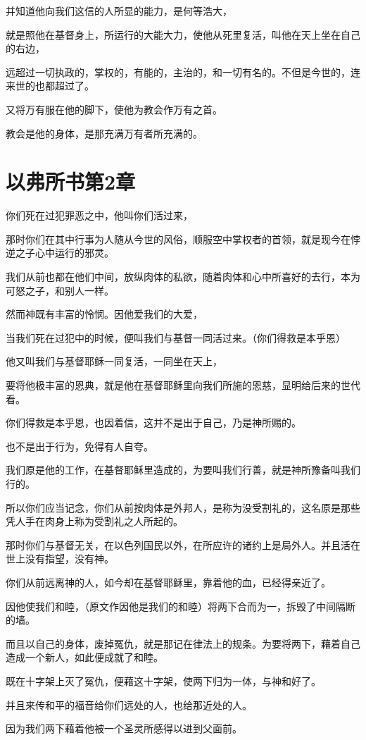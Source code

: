 \documentclass[12pt,oneside]{book}
\begin{document}
并知道他向我们这信的人所显的能力，是何等浩大，

就是照他在基督身上，所运行的大能大力，使他从死里复活，叫他在天上坐在自己的右边，

远超过一切执政的，掌权的，有能的，主治的，和一切有名的。不但是今世的，连来世的也都超过了。

又将万有服在他的脚下，使他为教会作万有之首。

教会是他的身体，是那充满万有者所充满的。

\chapter{以弗所书第2章}
你们死在过犯罪恶之中，他叫你们活过来，

那时你们在其中行事为人随从今世的风俗，顺服空中掌权者的首领，就是现今在悖逆之子心中运行的邪灵。

我们从前也都在他们中间，放纵肉体的私欲，随着肉体和心中所喜好的去行，本为可怒之子，和别人一样。

然而神既有丰富的怜悯。因他爱我们的大爱，

当我们死在过犯中的时候，便叫我们与基督一同活过来。（你们得救是本乎恩）

他又叫我们与基督耶稣一同复活，一同坐在天上，

要将他极丰富的恩典，就是他在基督耶稣里向我们所施的恩慈，显明给后来的世代看。

你们得救是本乎恩，也因着信，这并不是出于自己，乃是神所赐的。

也不是出于行为，免得有人自夸。

我们原是他的工作，在基督耶稣里造成的，为要叫我们行善，就是神所豫备叫我们行的。

所以你们应当记念，你们从前按肉体是外邦人，是称为没受割礼的，这名原是那些凭人手在肉身上称为受割礼之人所起的。

那时你们与基督无关，在以色列国民以外，在所应许的诸约上是局外人。并且活在世上没有指望，没有神。

你们从前远离神的人，如今却在基督耶稣里，靠着他的血，已经得亲近了。

因他使我们和睦，（原文作因他是我们的和睦）将两下合而为一，拆毁了中间隔断的墙。

而且以自己的身体，废掉冤仇，就是那记在律法上的规条。为要将两下，藉着自己造成一个新人，如此便成就了和睦。

既在十字架上灭了冤仇，便藉这十字架，使两下归为一体，与神和好了。

并且来传和平的福音给你们远处的人，也给那近处的人。

因为我们两下藉着他被一个圣灵所感得以进到父面前。
\end{document}
